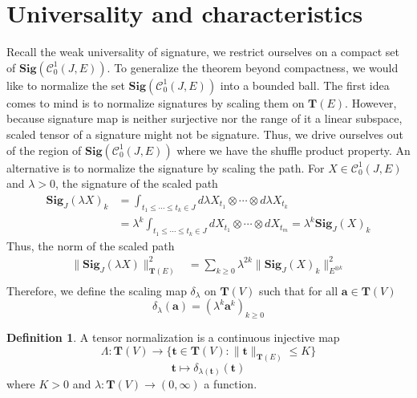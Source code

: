 \documentclass[12pt]{report}
\theoremstyle{definition}
\newtheorem{definition}[theorem]{Definition}
\theoremstyle{remark}
\begin{document}
\section{Universality and characteristics }
Recall the weak universality of signature, we restrict ourselves on a compact set of $\mathbf{Sig}(\mathcal{C}^{1}_{0}(J,E))$. To generalize the theorem beyond compactness, we would like to normalize the set $\mathbf{Sig}(\mathcal{C}^{1}_{0}(J,E))$ into a bounded ball. The first idea comes to mind is to normalize signatures by scaling them on $\mathbf{T}(E)$. However, because signature map is neither surjective nor the range of it a linear subspace, scaled tensor of a signature might not be signature. Thus, we drive ourselves out of the region of $\mathbf{Sig}(\mathcal{C}^{1}_{0}(J,E))$ where we have the shuffle product property. An alternative is to normalize the signature by scaling the path. For $X \in \mathcal{C}^{1}_{0}(J,E)$ and $\lambda > 0$, the signature of the scaled path
\begin{equation}
  \begin{split}
    \mathbf{Sig}_{J}(\lambda X)_{k} &= \int_{t_{1}\leq\cdots\leq t_{k} \in J}d\lambda X_{t_{1}}\otimes\cdots\otimes d\lambda  X_{t_{k}}\\ 
    &= \lambda^{k}\int_{t_{1}\leq\cdots\leq t_{k} \in J}dX_{t_{1}}\otimes\cdots\otimes dX_{t_{m}} = \lambda^{k}\mathbf{Sig}_{J}(X)_{k}
  \end{split}
\end{equation}
Thus, the norm of the scaled path
\begin{equation}
  \begin{split}
    \big\lVert \mathbf{Sig}_{J}(\lambda X)\big\rVert_{\mathbf{T}(E)}^{2} &= \sum_{k\geq 0} \lambda^{2k} \lVert \mathbf{Sig}_{J}(X)_{k}\rVert_{E^{\otimes k}}^{2} \\
  \end{split}
\end{equation}
Therefore, we define the scaling map $\delta_{\lambda}$ on $\mathbf{T}(V)$ such that for all $\mathbf{a} \in \mathbf{T}(V)$ 
\begin{equation}
  \delta_{\lambda}(\mathbf{a}) = (\lambda^{k} \mathbf{a}^{k})_{k\geq 0}
\end{equation} 
\begin{definition}
  A tensor normalization is a continuous injective map 
  \begin{equation}
    \Lambda\colon \mathbf{T}(V) \to \{\mathbf{t} \in \mathbf{T}(V)\colon \lVert\mathbf{t}\rVert_{\mathbf{T}(E)} \leq K\}
  \end{equation}
  \begin{equation}
    \mathbf{t} \mapsto \delta_{\lambda(\mathbf{t} )}(\mathbf{t} )
  \end{equation}
  where $K > 0$ and $\lambda\colon \mathbf{T}(V) \to (0,\infty)$ a function. 
\end{definition}
\end{document}
